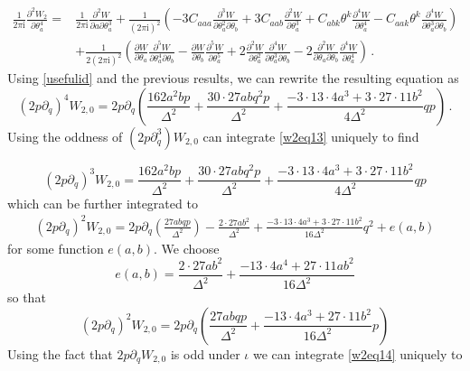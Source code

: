 \documentclass{article}
\theoremstyle{definition}
\numberwithin{equation}{section}
\begin{document}
\begin{equation}\label{w2eq12}
\begin{split}
\frac{1}{2\pi \mathrm{i}}\frac{\partial^2 W_2}{\partial \theta_a^4}=&\frac{1}{2\pi \mathrm{i}}\frac{\partial^2W}{\partial a \partial \theta_a^3}+\frac{1}{(2\pi \mathrm{i})^2}\left(-3C_{aaa}\frac{\partial^3 W}{\partial \theta_a^2\partial  \theta_b}+3C_{aab}\frac{\partial^2 W}{\partial \theta_a^3}+C_{abk}\theta^k\frac{\partial^4 W}{\partial \theta_a^4}-C_{aak}\theta^k\frac{\partial^4W}{\partial \theta_a^3 \partial \theta_b}\right)\\
&+\frac{1}{2(2\pi \mathrm{i})^2}\left(\frac{\partial W}{\partial \theta_a}\frac{\partial^5W}{\partial \theta_a^4 \partial \theta_b}-\frac{\partial W}{\partial \theta_b}\frac{\partial^5W}{\partial \theta_a^5}+2\frac{\partial^2W}{\partial \theta_a^2}\frac{\partial^4W}{\partial \theta_a^3 \partial \theta_b}-2\frac{\partial^2W}{\partial \theta_a \partial \theta_b}\frac{\partial^4W}{\partial \theta_a^4}\right)\,.
\end{split}
\end{equation}
Using \eqref{usefulid} and the previous results, we can rewrite the resulting equation as 
\begin{equation}\label{w2eq13}
(2p\partial_q)^4W_{2,0}=2p\partial_q\left(\frac{162a^2bp}{\Delta^2}+\frac{30\cdot 27abq^2p}{\Delta^2}+\frac{-3\cdot 13\cdot 4a^3+3\cdot 27\cdot 11 b^2}{4\Delta^2}qp\right)\,.
\end{equation}
Using the oddness of $(2p\partial_q^3)W_{2,0}$ can integrate \eqref{w2eq13} uniquely to find 

\begin{equation*}
(2p\partial_q)^3W_{2,0}=\frac{162a^2bp}{\Delta^2}+\frac{30\cdot 27abq^2p}{\Delta^2}+\frac{-3\cdot 13\cdot 4a^3+3\cdot 27\cdot 11 b^2}{4\Delta^2}qp
\end{equation*}
which can be further integrated to 
\begin{equation}
\begin{split}(2p\partial_q)^2W_{2,0}=2p\partial_q\left(\frac{27abqp}{\Delta^2}\right)-\frac{2\cdot 27ab^2}{\Delta^2}+\frac{-3\cdot 13\cdot 4a^3+3\cdot 27\cdot 11 b^2}{16\Delta^2}q^2+e(a,b)
\end{split}
\end{equation}
for some function $e(a,b)$. We choose 
\begin{equation*}
    e(a,b)=\frac{2\cdot 27ab^2}{\Delta^2}+\frac{- 13\cdot 4a^4+ 27\cdot 11 ab^2}{16\Delta^2}
\end{equation*}
so that 
\begin{equation}\label{w2eq14}
    (2p\partial_q)^2W_{2,0}=2p\partial_q\left(\frac{27abqp}{\Delta^2}+\frac{- 13\cdot 4a^3+ 27\cdot 11 b^2}{16\Delta^2}p\right)
\end{equation}
Using the fact that  $2p\partial_qW_{2,0}$ is odd under $\iota$ we can integrate \eqref{w2eq14} uniquely to  
\end{document}
